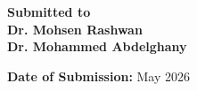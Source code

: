 \begin{titlepage}
\vspace{2cm}

\begin{center}
    {\Large \textbf{Submitted to}} \\[6pt]
    {\Large \textbf{Dr. Mohsen Rashwan}}\\[0.3cm]
    {\Large \textbf{Dr. Mohammed Abdelghany}}\\[1cm]
\end{center}

\vfill

\begin{center}
    {\large \textbf{Date of Submission:} May 2026}
\end{center}

\end{titlepage}
